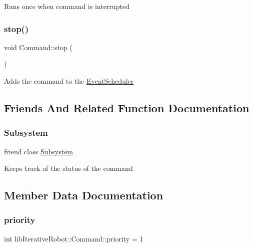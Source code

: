 Runs once when command is interrupted \mbox{\label{classlib_iterative_robot_1_1_command_ac91308101424f447f80665244b554171}} 
\subsubsection{\texorpdfstring{stop()}{stop()}}
{\footnotesize\ttfamily void Command\+::stop (\begin{DoxyParamCaption}{ }\end{DoxyParamCaption})}

Adds the command to the \mbox{\hyperlink{classlib_iterative_robot_1_1_event_scheduler}{Event\+Scheduler}} 

\subsection{Friends And Related Function Documentation}
\mbox{\label{classlib_iterative_robot_1_1_command_a9b67dc4c93b18626e753aa0938abbf7d}} 
\subsubsection{\texorpdfstring{Subsystem}{Subsystem}}
{\footnotesize\ttfamily friend class \mbox{\hyperlink{classlib_iterative_robot_1_1_subsystem}{Subsystem}}\hspace{0.3cm}{\ttfamily [friend]}}

Keeps track of the status of the command 

\subsection{Member Data Documentation}
\mbox{\label{classlib_iterative_robot_1_1_command_af2fd312376da33f5eba582db90389511}} 
\subsubsection{\texorpdfstring{priority}{priority}}
{\footnotesize\ttfamily int lib\+Iterative\+Robot\+::\+Command\+::priority = 1}

